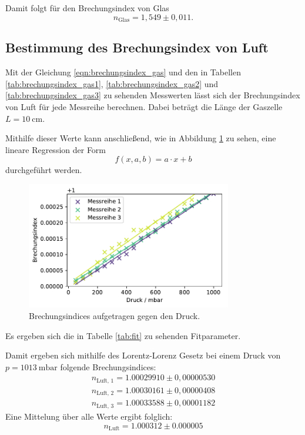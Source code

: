 Damit folgt für den Brechungsindex von Glas
\begin{equation}
    n_\text{Glas} = 1,549 \pm 0,011 .
\end{equation}

\subsection{Bestimmung des Brechungsindex von Luft}
Mit der Gleichung \ref{eqn:brechungsindex_gas} und den in Tabellen \ref{tab:brechungsindex_gas1}, \ref{tab:brechungsindex_gas2} und \ref{tab:brechungsindex_gas3} zu sehenden Messwerten lässt sich der Brechungsindex von Luft für jede Messreihe berechnen. Dabei beträgt die Länge der Gaszelle $L = \SI{10}{\centi \meter}$.



Mithilfe dieser Werte kann anschließend, wie in Abbildung \ref{fig:n} zu sehen,  eine lineare Regression der Form 
\begin{equation}
    f(x, a, b) = a \cdot x + b
\end{equation}
durchgeführt werden. 
\begin{figure}[H]
    \centering
    \includegraphics[width=0.8\textwidth]{data/Plots/Brechungsindex.pdf}
    \caption{Brechungsindices aufgetragen gegen den Druck. }
    \label{fig:n}
\end{figure}
Es ergeben sich die in Tabelle \ref{tab:fit} zu sehenden Fitparameter.

Damit ergeben sich mithilfe des Lorentz-Lorenz Gesetz bei einem Druck von $p = \SI{1013}{\milli \bar}$ folgende Brechungsindices:
\begin{align}                                 
    n_\text{Luft, 1} = 1.00029910 \pm 0,00000530   \\
    n_\text{Luft, 2} = 1.00030161 \pm 0,00000408   \\
    n_\text{Luft, 3} = 1.00033588 \pm 0,00001182  
\end{align}
Eine Mittelung über alle Werte ergibt folglich:
\begin{equation}
    n_\text{Luft} = 1.000312 \pm 0.000005
\end{equation}


